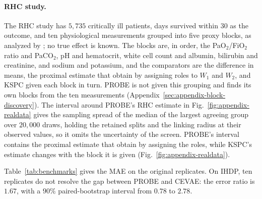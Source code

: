 \paragraph{RHC study.}\label{sec:appendix-rhc} The RHC study \citep{connors1996effectiveness} has $5{,}735$ critically ill patients, days survived within $30$ as the outcome, and ten physiological measurements grouped into five proxy blocks, as analyzed by \citet{cui2024semiparametric}; no true effect is known. The blocks are, in order, the PaO$_2$/FiO$_2$ ratio and PaCO$_2$, pH and hematocrit, white cell count and albumin, bilirubin and creatinine, and sodium and potassium, and the comparators are the difference in means, the proximal estimate that \citet{cui2024semiparametric} obtain by assigning roles to $W_1$ and $W_2$, and KSPC given each block in turn. PROBE is not given this grouping and finds its own blocks from the ten measurements (Appendix~\ref{sec:appendix-block-discovery}). The interval around PROBE's RHC estimate in Fig.~\ref{fig:appendix-realdata} gives the sampling spread of the median of the largest agreeing group over $20{,}000$ draws, holding the retained splits and the linking radius at their observed values, so it omits the uncertainty of the screen. PROBE's interval contains the proximal estimate that \citet{cui2024semiparametric} obtain by assigning the roles, while KSPC's estimate changes with the block it is given (Fig.~\ref{fig:appendix-realdata}).

Table~\ref{tab:benchmarks} gives the MAE on the original replicates. On IHDP, ten replicates do not resolve the gap between PROBE and CEVAE: the error ratio is $1.67$, with a $90\%$ paired-bootstrap interval from $0.78$ to $2.78$.

